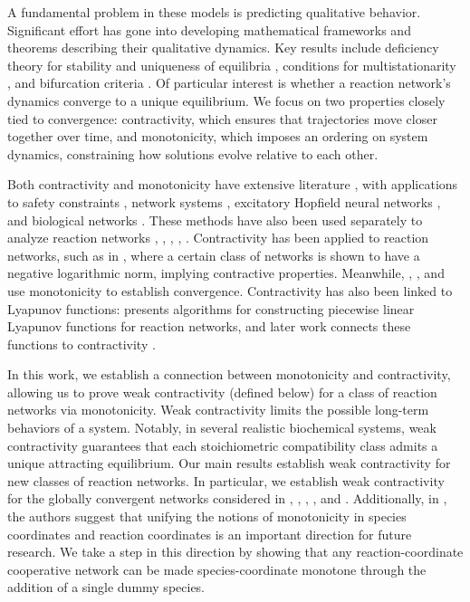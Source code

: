 \documentclass{article}
\begin{document}
A fundamental problem in these models is predicting qualitative behavior. Significant effort has gone into developing mathematical frameworks and theorems describing their qualitative dynamics. Key results include deficiency theory for stability and uniqueness of equilibria \cite{Feinberg}, conditions for multistationarity \cite{doi:10.1137/15M1034441}, and bifurcation criteria \cite{Banaji_2023}. Of particular interest is whether a reaction network's dynamics converge to a unique equilibrium. We focus on two properties closely tied to convergence: contractivity, which ensures that trajectories move closer together over time, and monotonicity, which imposes an ordering on system dynamics, constraining how solutions evolve relative to each other.




Both contractivity and monotonicity have extensive literature \cite{smith2008monotone} \cite{7039986} \cite{LOHMILLER1998683} \cite{9799744}, \cite{SIMPSONPORCO201474} with applications to safety constraints \cite{jafarpour2023monotonicity}, network systems \cite{9403888}, excitatory Hopfield neural networks \cite{9961864}, and biological networks \cite{alradhawi2023structural}. These methods have also been used separately to analyze reaction networks \cite{article}, \cite{Angeli2010-hj}, \cite{BANAJI20131359}, \cite{doi:10.1137/120898486}, \cite{doi:10.1080/14689360802243813}. Contractivity has been applied to reaction networks, such as in \cite{article}, where a certain class of networks is shown to have a negative logarithmic norm, implying contractive properties. Meanwhile, \cite{Angeli2010-hj}, \cite{BANAJI20131359}, and \cite{doi:10.1137/120898486} use monotonicity to establish convergence. Contractivity has also been linked to Lyapunov functions: \cite{7097666} presents algorithms for constructing piecewise linear Lyapunov functions for reaction networks, and later work connects these functions to contractivity \cite{alradhawi2023structural}.





In this work, we establish a connection between monotonicity and contractivity, allowing us to prove weak contractivity (defined below) for a class of reaction networks via monotonicity. Weak contractivity limits the possible long-term behaviors of a system. Notably, in several realistic biochemical systems, weak contractivity guarantees that each stoichiometric compatibility class admits a unique attracting equilibrium. Our main results establish weak contractivity for new classes of reaction networks. In particular, we establish weak contractivity for the globally convergent networks considered in \cite{doi:10.1137/120898486}, \cite{BANAJI20131359}, \cite{Angeli2010-hj}, \cite{leenheer_monotone_reaction_networks}, and \cite{EITHUN20171}. Additionally, in \cite{doi:10.1137/120898486}, the authors suggest that unifying the notions of monotonicity in species coordinates and reaction coordinates is an important direction for future research. We take a step in this direction by showing that any reaction-coordinate cooperative network can be made species-coordinate monotone through the addition of a single dummy species.
\end{document}
